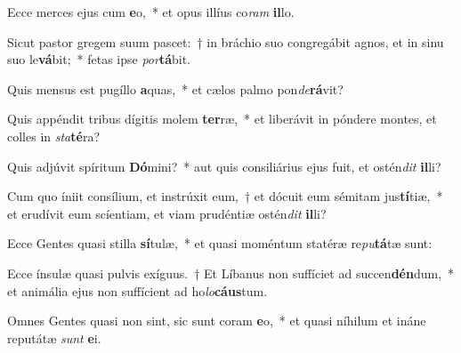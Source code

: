 \item Ecce merces ejus cum \textbf{e}o,~* et opus illíus co\textit{ram} \textbf{il}lo.
\item Sicut pastor gregem suum pascet:~† in bráchio suo congregábit agnos, et in sinu suo le\textbf{vá}bit;~* fetas ipse \textit{por}\textbf{tá}bit.
\item Quis mensus est pugíllo \textbf{a}quas,~* et cælos palmo pon\textit{de}\textbf{rá}vit?
\item Quis appéndit tribus dígitis molem \textbf{ter}ræ,~* et liberávit in póndere montes, et colles in \textit{sta}\textbf{té}ra?
\item Quis adjúvit spíritum \textbf{Dó}mini?~* aut quis consiliárius ejus fuit, et ostén\textit{dit} \textbf{il}li?
\item Cum quo íniit consílium, et instrúxit eum,~† et dócuit eum sémitam jus\textbf{tí}tiæ,~* et erudívit eum scíentiam, et viam prudéntiæ ostén\textit{dit} \textbf{il}li?
\item Ecce Gentes quasi stilla \textbf{sí}tulæ,~* et quasi moméntum statéræ re\textit{pu}\textbf{tá}tæ sunt:
\item Ecce ínsulæ quasi pulvis exíguus.~† Et Líbanus non suffíciet ad succen\textbf{dén}dum,~* et animália ejus non suffícient ad ho\textit{lo}\textbf{cáus}tum.
\item Omnes Gentes quasi non sint, sic sunt coram \textbf{e}o,~* et quasi níhilum et ináne reputátæ \textit{sunt} \textbf{e}i.
